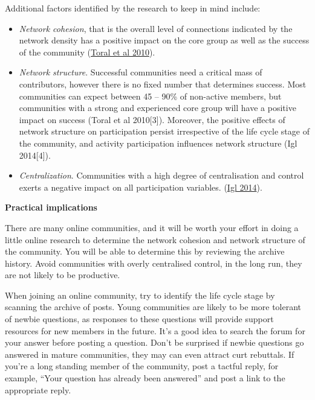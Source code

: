 \documentclass[
]{book}
\providecommand{\tightlist}{%
  \setlength{\itemsep}{0pt}\setlength{\parskip}{0pt}}
\theoremstyle{definition}
\theoremstyle{definition}
\theoremstyle{definition}
\theoremstyle{definition}
\theoremstyle{remark}
\begin{document}
Additional factors identified by the research to keep in mind include:

\begin{itemize}
\tightlist
\item
  \emph{Network cohesion}, that is the overall level of connections indicated by the network density has a positive impact on the core group as well as the success of the community (\href{https://twu.idm.oclc.org/login?url=https://search.ebscohost.com/login.aspx?direct=true\&db=edselp\&AN=S0950584909001888\&site=eds-live\&scope=site}{Toral et al 2010}).\\
\item
  \emph{Network structure}. Successful communities need a critical mass of contributors, however there is no fixed number that determines success. Most communities can expect between 45 -- 90\% of non-active members, but communities with a strong and experienced core group will have a positive impact on success (Toral et al 2010{[}3{]}). Moreover, the positive effects of network structure on participation persist irrespective of the life cycle stage of the community, and activity participation influences network structure (Igl 2014{[}4{]}).\\
\item
  \emph{Centralization}. Communities with a high degree of centralisation and control exerts a negative impact on all participation variables. (\href{https://mediatum.ub.tum.de/node?id=1218984}{Igl 2014}).
\end{itemize}

\textbf{Practical implications}

There are many online communities, and it will be worth your effort in doing a little online research to determine the network cohesion and network structure of the community. You will be able to determine this by reviewing the archive history. Avoid communities with overly centralised control, in the long run, they are not likely to be productive.

When joining an online community, try to identify the life cycle stage by scanning the archive of posts. Young communities are likely to be more tolerant of newbie questions, as responses to these questions will provide support resources for new members in the future. It's a good idea to search the forum for your answer before posting a question. Don't be surprised if newbie questions go answered in mature communities, they may can even attract curt rebuttals. If you're a long standing member of the community, post a tactful reply, for example, ``Your question has already been answered'' and post a link to the appropriate reply.
\end{document}
